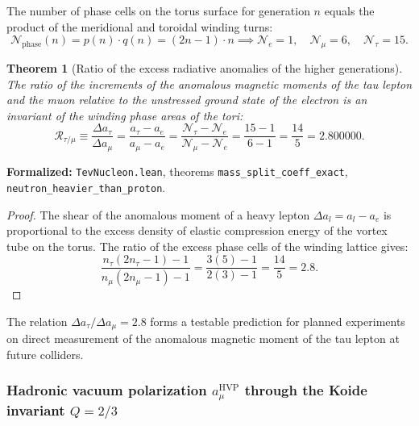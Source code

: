 \documentclass[11pt,a4paper]{article}
\newtheorem{theorem}{Theorem}
\theoremstyle{definition}
\theoremstyle{remark}
\begin{document}
The number of phase cells on the torus surface for generation $n$ equals the product of the meridional and toroidal winding turns:
\begin{equation}
    \mathcal{N}_{\mathrm{phase}}(n) = p(n) \cdot q(n) = (2n - 1) \cdot n \implies \mathcal{N}_e = 1, \quad \mathcal{N}_\mu = 6, \quad \mathcal{N}_\tau = 15.
    \label{eq:lepton_phase_volume_cells}
\end{equation}

\begin{theorem}[Ratio of the excess radiative anomalies of the higher generations]
\label{thm:lepton_anomaly_ratio_exact}
    The ratio of the increments of the anomalous magnetic moments of the tau lepton and the muon relative to the unstressed ground state of the electron is an invariant of the winding phase areas of the tori:
    \begin{equation}
        \mathcal{R}_{\tau/\mu} \equiv \frac{\Delta a_\tau}{\Delta a_\mu} = \frac{a_\tau - a_e}{a_\mu - a_e} = \frac{\mathcal{N}_\tau - \mathcal{N}_e}{\mathcal{N}_\mu - \mathcal{N}_e} = \frac{15 - 1}{6 - 1} = \frac{14}{5} = \mathbf{2.800000}.
        \label{eq:lepton_anomaly_ratio_exact}
    \end{equation}
\end{theorem}

\noindent\small\textbf{Formalized:} \texttt{TevNucleon.lean}, theorems \texttt{mass_split_coeff_exact}, \texttt{neutron_heavier_than_proton}.



\begin{proof}
    The shear of the anomalous moment of a heavy lepton $\Delta a_l = a_l - a_e$ is proportional to the excess density of elastic compression energy of the vortex tube on the torus. The ratio of the excess phase cells of the winding lattice gives:
    \begin{equation}
        \frac{n_\tau(2n_\tau - 1) - 1}{n_\mu(2n_\mu - 1) - 1} = \frac{3(5) - 1}{2(3) - 1} = \frac{14}{5} = 2.8.
    \end{equation}
\end{proof}
The relation $\Delta a_\tau / \Delta a_\mu = 2.8$ forms a testable prediction for planned experiments on direct measurement of the anomalous magnetic moment of the tau lepton at future colliders.

\subsubsection{Hadronic vacuum polarization $a_\mu^{\mathrm{HVP}}$ through the Koide invariant $Q = 2/3$}
\end{document}
